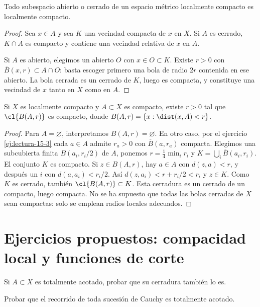 \begin{proposicion}\label{ch15:subespacios}
Todo subespacio abierto o cerrado de un espacio métrico localmente compacto es localmente compacto.
\end{proposicion}
\begin{proof}
Sea $x\in A$ y sea $K$ una vecindad compacta de $x$ en $X$. Si $A$ es cerrado, $K\cap A$ es compacto y contiene una vecindad relativa de $x$ en $A$.

Si $A$ es abierto, elegimos un abierto $O$ con $x\in O\subset K$. Existe $r>0$ con $\overline B(x,r)\subset A\cap O$: basta escoger primero una bola de radio $2r$ contenida en ese abierto. La bola cerrada es un cerrado de $K$, luego es compacta, y constituye una vecindad de $x$ tanto en $X$ como en $A$.
\end{proof}

\begin{proposicion}\label{ch15:engrosamiento}
Si $X$ es localmente compacto y $A\subset X$ es compacto, existe $r>0$ tal que $\cl{B(A,r)}$ es compacto, donde $B(A,r)=\{x:\dist(x,A)<r\}$.
\end{proposicion}
\begin{proof}
Para $A=\varnothing$, interpretamos $B(A,r)=\varnothing$. En otro caso, por el ejercicio \ref{ej:lectura-15-3} cada $a\in A$ admite $r_a>0$ con $\overline B(a,r_a)$ compacta. Elegimos una subcubierta finita $B(a_i,r_i/2)$ de $A$, ponemos $r=\frac14\min_i r_i$ y $K=\bigcup_i\overline B(a_i,r_i)$. El conjunto $K$ es compacto. Si $z\in B(A,r)$, hay $a\in A$ con $d(z,a)<r$, y después un $i$ con $d(a,a_i)<r_i/2$. Así $d(z,a_i)<r+r_i/2<r_i$ y $z\in K$. Como $K$ es cerrado, también $\cl{B(A,r)}\subset K$. Esta cerradura es un cerrado de un compacto, luego compacta. No se ha supuesto que todas las bolas cerradas de $X$ sean compactas: solo se emplean radios locales adecuados.
\end{proof}

\section{Ejercicios propuestos: compacidad local y funciones de corte}
\begin{ejercicio}\label{ej:lectura-15-1}
Si $A\subset X$ es totalmente acotado, probar que su cerradura también lo es.
\end{ejercicio}


\begin{ejercicio}\label{ej:lectura-15-2}
Probar que el recorrido de toda sucesión de Cauchy es totalmente acotado.
\end{ejercicio}



